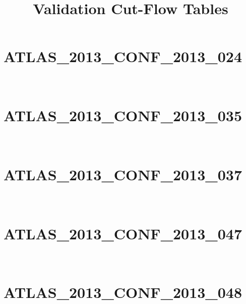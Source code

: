 \documentclass[12pt]{article}
\title{Validation Cut-Flow Tables}
\date{}
\begin{document}
        \maketitle
        \tableofcontents
        \newpage
    
\section{ATLAS\_2013\_CONF\_2013\_024}


\newpage
\newpage\newpage~\newpage\section{ATLAS\_2013\_CONF\_2013\_035}


\newpage
\newpage
\newpage
\newpage
\newpage
\newpage\newpage~\newpage\section{ATLAS\_2013\_CONF\_2013\_037}


\newpage
\newpage\newpage~\newpage\section{ATLAS\_2013\_CONF\_2013\_047}


\newpage
\newpage
\newpage
\newpage
\newpage
\newpage
\newpage
\newpage\newpage~\newpage\section{ATLAS\_2013\_CONF\_2013\_048}
\end{document}
